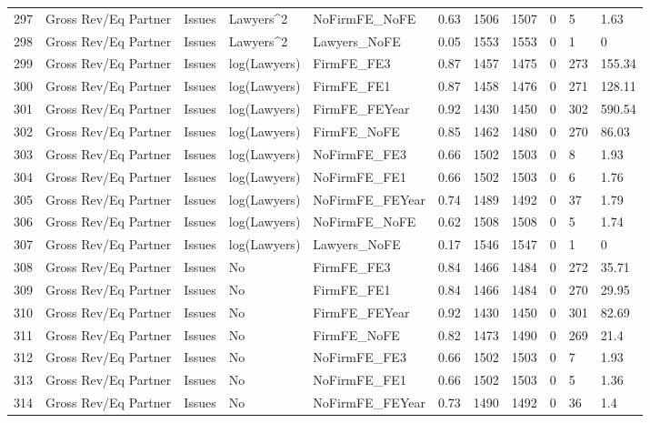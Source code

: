\documentclass{article}
\begin{document}
\begin{table}[H]
\begin{tabular}{rllllllllll}
  297 & Gross Rev/Eq Partner & Issues & Lawyers^2 & NoFirmFE\_NoFE & 0.63 & 1506 & 1507 & 0 & 5 & 1.63 \\ 
  298 & Gross Rev/Eq Partner & Issues & Lawyers^2 & Lawyers\_NoFE & 0.05 & 1553 & 1553 & 0 & 1 & 0 \\ 
  299 & Gross Rev/Eq Partner & Issues & log(Lawyers) & FirmFE\_FE3 & 0.87 & 1457 & 1475 & 0 & 273 & 155.34 \\ 
  300 & Gross Rev/Eq Partner & Issues & log(Lawyers) & FirmFE\_FE1 & 0.87 & 1458 & 1476 & 0 & 271 & 128.11 \\ 
  301 & Gross Rev/Eq Partner & Issues & log(Lawyers) & FirmFE\_FEYear & 0.92 & 1430 & 1450 & 0 & 302 & 590.54 \\ 
  302 & Gross Rev/Eq Partner & Issues & log(Lawyers) & FirmFE\_NoFE & 0.85 & 1462 & 1480 & 0 & 270 & 86.03 \\ 
  303 & Gross Rev/Eq Partner & Issues & log(Lawyers) & NoFirmFE\_FE3 & 0.66 & 1502 & 1503 & 0 & 8 & 1.93 \\ 
  304 & Gross Rev/Eq Partner & Issues & log(Lawyers) & NoFirmFE\_FE1 & 0.66 & 1502 & 1503 & 0 & 6 & 1.76 \\ 
  305 & Gross Rev/Eq Partner & Issues & log(Lawyers) & NoFirmFE\_FEYear & 0.74 & 1489 & 1492 & 0 & 37 & 1.79 \\ 
  306 & Gross Rev/Eq Partner & Issues & log(Lawyers) & NoFirmFE\_NoFE & 0.62 & 1508 & 1508 & 0 & 5 & 1.74 \\ 
  307 & Gross Rev/Eq Partner & Issues & log(Lawyers) & Lawyers\_NoFE & 0.17 & 1546 & 1547 & 0 & 1 & 0 \\ 
  308 & Gross Rev/Eq Partner & Issues & No & FirmFE\_FE3 & 0.84 & 1466 & 1484 & 0 & 272 & 35.71 \\ 
  309 & Gross Rev/Eq Partner & Issues & No & FirmFE\_FE1 & 0.84 & 1466 & 1484 & 0 & 270 & 29.95 \\ 
  310 & Gross Rev/Eq Partner & Issues & No & FirmFE\_FEYear & 0.92 & 1430 & 1450 & 0 & 301 & 82.69 \\ 
  311 & Gross Rev/Eq Partner & Issues & No & FirmFE\_NoFE & 0.82 & 1473 & 1490 & 0 & 269 & 21.4 \\ 
  312 & Gross Rev/Eq Partner & Issues & No & NoFirmFE\_FE3 & 0.66 & 1502 & 1503 & 0 & 7 & 1.93 \\ 
  313 & Gross Rev/Eq Partner & Issues & No & NoFirmFE\_FE1 & 0.66 & 1502 & 1503 & 0 & 5 & 1.36 \\ 
  314 & Gross Rev/Eq Partner & Issues & No & NoFirmFE\_FEYear & 0.73 & 1490 & 1492 & 0 & 36 & 1.4 \\ 

\end{tabular}
\end{table}
\end{document}
